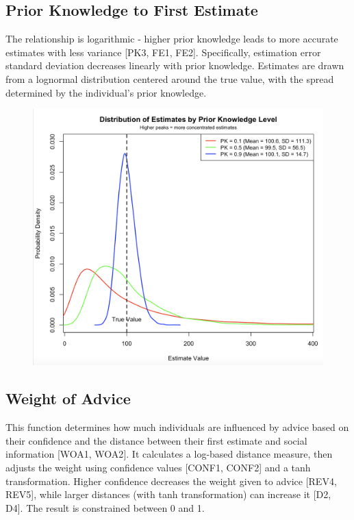 \documentclass[
  man,floatsintext]{apa6}
\begin{document}
\hypertarget{prior-knowledge-to-first-estimate}{%
\subsection{Prior Knowledge to First Estimate}\label{prior-knowledge-to-first-estimate}}

The relationship is logarithmic - higher prior knowledge leads to more accurate estimates with less variance {[}PK3, FE1, FE2{]}. Specifically, estimation error standard deviation decreases linearly with prior knowledge. Estimates are drawn from a lognormal distribution centered around the true value, with the spread determined by the individual's prior knowledge.

\begin{figure}[H]
\includegraphics[width=4.56in]{photos/pk_estimate} \caption{ }\label{fig:unnamed-chunk-3}
\end{figure}

\hypertarget{weight-of-advice}{%
\subsection{Weight of Advice}\label{weight-of-advice}}

This function determines how much individuals are influenced by advice based on their confidence and the distance between their first estimate and social information {[}WOA1, WOA2{]}. It calculates a log-based distance measure, then adjusts the weight using confidence values {[}CONF1, CONF2{]} and a tanh transformation. Higher confidence decreases the weight given to advice {[}REV4, REV5{]}, while larger distances (with tanh transformation) can increase it {[}D2, D4{]}. The result is constrained between 0 and 1.
\end{document}
